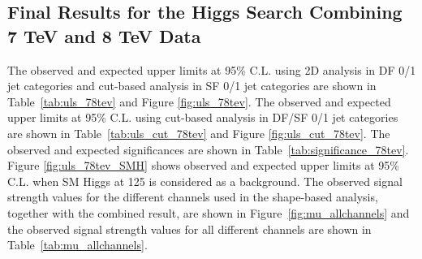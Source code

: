\clearpage 
\subsection{Final Results for the Higgs Search Combining 7 TeV and 8 TeV Data}
\label{sec:search_results_finalcomb}

The observed and expected upper limits at 95\% C.L. using 2D analysis in DF 0/1 jet categories 
and cut-based analysis in SF 0/1 jet categories are shown in Table~\ref{tab:uls_78tev} and Figure \ref{fig:uls_78tev}.
The observed and expected upper limits at 95\% C.L. using cut-based analysis in DF/SF 0/1 jet categories 
are shown in Table~\ref{tab:uls_cut_78tev} and Figure \ref{fig:uls_cut_78tev}.
The observed and expected significances are shown in Table~\ref{tab:significance_78tev}. 
Figure \ref{fig:uls_78tev_SMH} shows observed and expected upper limits at 95\% C.L.
when SM Higgs at 125 \GeV is considered as a background. The observed signal
strength values for the different channels used in the shape-based analysis,
together with the combined result, are shown in Figure~\ref{fig:mu_allchannels} and the 
observed signal strength values for all different channels are shown in Table~\ref{tab:mu_allchannels}. 

